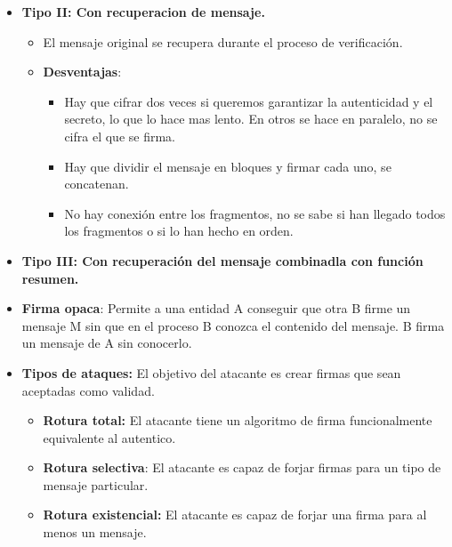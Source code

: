 \documentclass[12pt, twoside, openright]{report} %
\begin{document}
\begin{itemize}
    \item \textbf{Tipo II: Con recuperacion de mensaje.}
      

      \begin{itemize}
      \item El mensaje original se recupera durante el proceso de
        verificación.
        
      \item \textbf{Desventajas}:
        

        \begin{itemize}
        \item Hay que cifrar dos veces si queremos garantizar la
          autenticidad y el secreto, lo que lo hace mas lento. En otros
          se hace en paralelo, no se cifra el que se firma.
          
        \item Hay que dividir el mensaje en bloques y firmar cada uno, se
          concatenan.
          
        \item No hay conexión entre los fragmentos, no se sabe si han
          llegado todos los fragmentos o si lo han hecho en orden.
          
        \end{itemize}
      \end{itemize}
    \item \textbf{Tipo III: Con recuperación del mensaje combinadla con
      función resumen.}
      
    \item \textbf{Firma opaca}: Permite a una entidad A conseguir que otra B
      firme un mensaje M sin que en el proceso B conozca el contenido
      del mensaje. B firma un mensaje de A sin conocerlo.
      
    \item \textbf{Tipos de ataques:} El objetivo del atacante es crear
      firmas que sean aceptadas como validad.
      

      \begin{itemize}
      \item \textbf{Rotura total:} El atacante tiene un algoritmo de firma
        funcionalmente equivalente al autentico.
        
      \item \textbf{Rotura selectiva}: El atacante es capaz de forjar firmas
        para un tipo de mensaje particular.
        
      \item \textbf{Rotura existencial:} El atacante es capaz de forjar una
        firma para al menos un mensaje.
        

\end{itemize}
\end{itemize}
\end{document}
